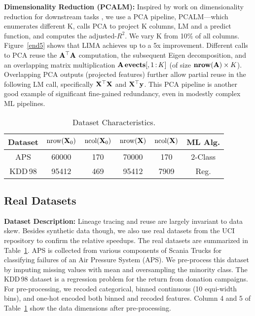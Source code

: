 \textbf{Dimensionality Reduction (PCALM):} Inspired by work on dimensionality reduction for downstream tasks \cite{SuriB19}, we use a PCA pipeline, PCALM---which enumerates different K, calls PCA to project K columns, LM and a predict function, and computes the adjusted-$R^{2}$. We vary K from 10\% of all columns. Figure~\ref{end5} shows that LIMA achieves up to a 5x improvement. Different calls to PCA reuse the $\mathbf{A}^{\top}\mathbf{A}$ computation, the subsequent Eigen decomposition, and an overlapping matrix multiplication $\mathbf{A}\,\mathbf{evects}[,1{\,:\,}K]$ (of size $\textbf{nrow}(\mathbf{A}) \times K$). Overlapping PCA outputs (projected features) further allow partial reuse in the following LM call, specifically $\mathbf{X}^{\top}\mathbf{X}$ and $\mathbf{X}^{\top}\mathbf{y}$. This PCA pipeline is another good example of significant fine-gained redundancy, even in modestly complex ML pipelines.


\begin{table}[!b]
	\centering \small \setlength\tabcolsep{6pt}
	\caption{\label{tab:data}Dataset Characteristics.}
	\vspace{-0.4cm}
	\begin{tabular}{cccccc}
		\toprule
		\textbf{Dataset} & $\text{nrow}(\mathbf{X}_0)$ & $\text{ncol}(\mathbf{X}_0)$ & $\text{nrow}(\mathbf{X})$ & $\text{ncol}(\mathbf{X})$ & ML Alg.\\
		\midrule
		APS & \num{60000} & 170 & \num{70000} &170 &2-Class\\
		KDD\,98 & \num{95412} &469& \num{95412} & \num{7909} & Reg.\\
		\bottomrule
	\end{tabular}
	\normalsize
\end{table}

\subsection{Real Datasets}
\label{sec:realadata}

\textbf{Dataset Description:} Lineage tracing and reuse are largely invariant to data skew. Besides synthetic data though, we also use real datasets from the UCI repository \cite{Dua2019} to confirm the relative speedups. The real datasets are summarized in Table~\ref{tab:data}. APS is collected from various components of Scania Trucks for classifying failures of an Air Pressure System (APS). We pre-process this dataset by imputing missing values with mean and oversampling the minority class. The KDD\,98 dataset is a regression problem for the return from donation campaigns. For pre-processing, we recoded categorical, binned continuous (10 equi-width bins), and one-hot encoded both binned and recoded features. Column 4 and 5 of Table~\ref{tab:data} show the data dimensions after pre-processing.
	

